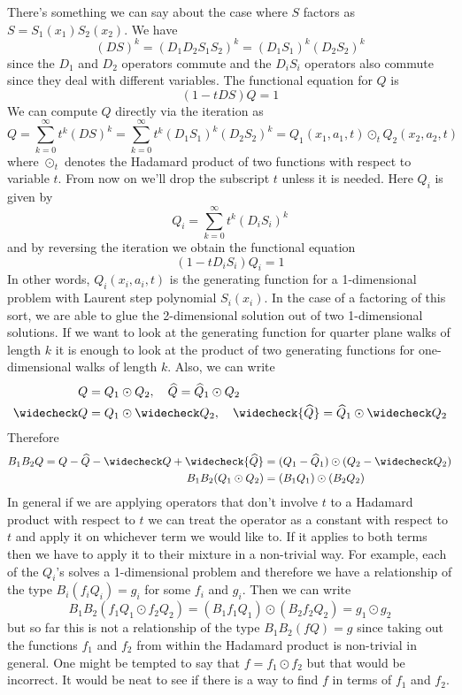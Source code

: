 \documentclass[12pt]{article}
\theoremstyle{definition} \newtheorem{definition}[theorem]{Definition}
\newcommand{\wh}{\widehat}
\newcommand{\wc}{\widecheck}
\begin{document}
There's something we can say about the case where $S$ factors as $S = S_1(x_1)S_2(x_2)$. We have
\[
	 (DS)^k = (D_1D_2S_1S_2)^k = (D_1S_1)^k(D_2S_2)^k
\]
since the $D_1$ and $D_2$ operators commute and the $D_iS_i$ operators also commute since they deal with different variables. The functional equation for $Q$ is
\[
	(1-tDS)Q = 1
\]
We can compute $Q$ directly via the iteration as 
\[
	Q = \sum_{k = 0}^{\infty} t^k (DS)^k = \sum_{k = 0}^{\infty} t^k (D_1S_1)^k(D_2S_2)^k = Q_1(x_1, a_1,t) \odot_t Q_2(x_2,a_2,t)
\]
where $\odot_t$ denotes the Hadamard product of two functions with respect to variable $t$. From now on we'll drop the subscript $t$ unless it is needed. Here $Q_i$ is given by
\[
	Q_i = \sum_{k = 0}^{\infty} t^k (D_iS_i)^k
\]
and by reversing the iteration we obtain the functional equation
\[
	(1-tD_iS_i)Q_i = 1
\]
In other words, $Q_i(x_i,a_i,t)$ is the generating function for a 1-dimensional problem with Laurent step polynomial $S_i(x_i)$. In the case of a factoring of this sort, we are able to glue the 2-dimensional solution out of two 1-dimensional solutions. If we want to look at the generating function for quarter plane walks of length $k$ it is enough to look at the product of two generating functions for one-dimensional walks of length $k$. Also, we can write
\begin{align*}
	Q &= Q_1 \odot Q_2, \quad \wh Q = \wh Q_1 \odot Q_2\\
	\wc Q &= Q_1 \odot \wc Q_2, \quad \wc{\wh Q}  = \wh Q_1 \odot \wc Q_2
\end{align*}
Therefore
\begin{align*}
	B_1 B_2 Q = Q-\wh Q -\wc Q + \wc{\wh Q} &= (Q_1 - \wh Q_1)\odot (Q_2 - \wc Q_2) \\
	B_1B_2(Q_1\odot Q_2) &=( B_1 Q_1) \odot ( B_2 Q_2)
\end{align*}
In general if we are applying operators that don't involve $t$ to a Hadamard product with respect to $t$ we can treat the operator as a constant with respect to $t$ and apply it on whichever term we would like to. If it applies to both terms then we have to apply it to their mixture in a non-trivial way. For example, each of the $Q_i$'s solves a 1-dimensional problem and therefore we have a relationship of the type $B_i (f_i Q_i) = g_i$ for some $f_i$ and $g_i$. Then we can write
\[
	B_1 B_2 (f_1 Q_1 \odot f_2 Q_2) = ( B_1 f_1 Q_1) \odot ( B_2 f_2 Q_2) = g_1 \odot g_2
\]
but so far this is not a relationship of the type $B_1B_2 (fQ) = g$ since taking out the functions $f_1$ and $f_2$ from within the Hadamard product is non-trivial in general. One might be tempted to say that $f = f_1 \odot f_2$ but that would be incorrect. It would be neat to see if there is a way to find $f$ in terms of $f_1$ and $f_2$.
\end{document}
